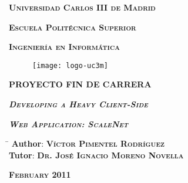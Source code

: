\begin{titlepage}

  \addtolength{\oddsidemargin}{0.45cm}

  \centerline{\large{\textbf{\textsc{Universidad Carlos III de Madrid}}}}
  \vspace{0.8cm}

  \centerline{\large{\textbf{\textsc{Escuela Politécnica Superior}}}}
  \vspace{0.8cm}

  \centerline{\large{\textbf{\textsc{Ingeniería en Informática}}}}

  \begin{figure}[!htbp]
    \centering\texttt{[image: logo-uc3m]}
  \end{figure}

  \centerline{\Large{\textbf{\uppercase{PROYECTO FIN DE CARRERA}}}}
  \vspace{2cm}

  \centerline{\huge{\textbf{\textit{\textsc{Developing a Heavy
  Client-Side}}}}}
  \vspace{0.4cm}

  \centerline{\huge{\textbf{\textit{\textsc{Web Application: ScaleNet}}}}}
  \vspace{3.5cm}

  \begin{flushright}
      \begin{tabbing}\hspace{2.5cm} \= \kill
        {\large{\textbf{Author}:}} \> {\large{\textbf{\textsc{Víctor Pimentel
        Rodríguez}}}}\\
        {\large{\textbf{Tutor}:}} \> {\large{\textbf{\textsc{Dr. José Ignacio
        Moreno Novella}}}}\\
      \end{tabbing}
  \end{flushright}

  \begin{flushright}
    {\large{\textbf{\textsc{February 2011}}}}
  \end{flushright}

\end{titlepage}